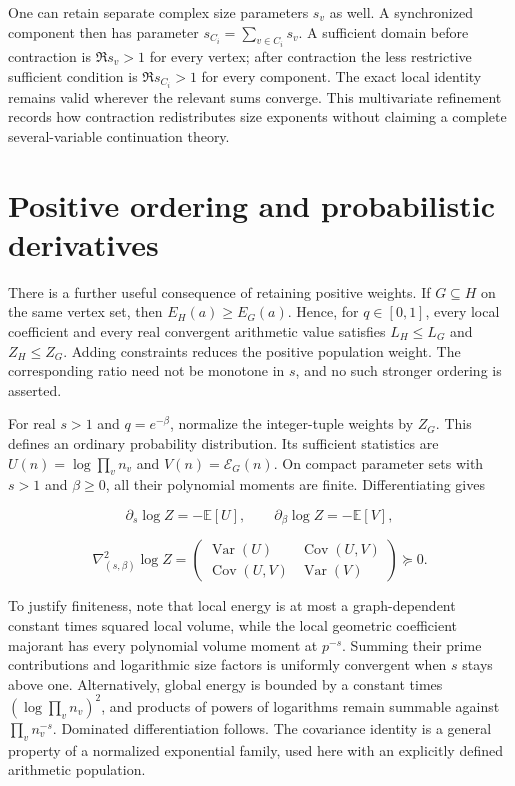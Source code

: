 \documentclass[
  11pt,
  a4paper,
]{report}
\begin{document}
One can retain separate complex size parameters \(s_v\) as well. A
synchronized component then has parameter
\(s_{C_i}=\sum_{v\in C_i}s_v\). A sufficient domain before contraction
is \(\Re s_v>1\) for every vertex; after contraction the less
restrictive sufficient condition is \(\Re s_{C_i}>1\) for every
component. The exact local identity remains valid wherever the relevant
sums converge. This multivariate refinement records how contraction
redistributes size exponents without claiming a complete
several-variable continuation theory.

\hypertarget{positive-ordering-and-probabilistic-derivatives}{%
\section{Positive ordering and probabilistic
derivatives}\label{positive-ordering-and-probabilistic-derivatives}}

There is a further useful consequence of retaining positive weights. If
\(G\subseteq H\) on the same vertex set, then \(E_H(a)\ge E_G(a)\).
Hence, for \(q\in[0,1]\), every local coefficient and every real
convergent arithmetic value satisfies \(L_H\le L_G\) and \(Z_H\le Z_G\).
Adding constraints reduces the positive population weight. The
corresponding ratio need not be monotone in \(s\), and no such stronger
ordering is asserted.

For real \(s>1\) and \(q=e^{-\beta}\), normalize the integer-tuple
weights by \(Z_G\). This defines an ordinary probability distribution.
Its sufficient statistics are \(U(n)=\log\prod_vn_v\) and
\(V(n)=\mathcal E_G(n)\). On compact parameter sets with \(s>1\) and
\(\beta\ge0\), all their polynomial moments are finite. Differentiating
gives

\[
 \partial_s\log Z=-\mathbb E[U],\qquad
 \partial_\beta\log Z=-\mathbb E[V],
\]

\[
 \nabla^2_{(s,\beta)}\log Z
 =\begin{pmatrix}\operatorname{Var}(U)&\operatorname{Cov}(U,V)\\
 \operatorname{Cov}(U,V)&\operatorname{Var}(V)\end{pmatrix}\succeq0.
 \tag{8.6}
\]

To justify finiteness, note that local energy is at most a
graph-dependent constant times squared local volume, while the local
geometric coefficient majorant has every polynomial volume moment at
\(p^{-s}\). Summing their prime contributions and logarithmic size
factors is uniformly convergent when \(s\) stays above one.
Alternatively, global energy is bounded by a constant times
\((\log\prod_vn_v)^2\), and products of powers of logarithms remain
summable against \(\prod_vn_v^{-s}\). Dominated differentiation follows.
The covariance identity is a general property of a normalized
exponential family, used here with an explicitly defined arithmetic
population.
\end{document}
